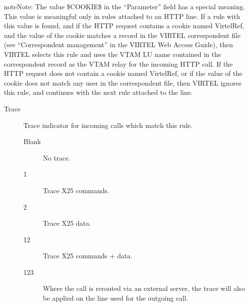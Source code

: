 \documentclass[letterpaper,10pt,english]{sphinxmanual}
\begin{document}
\begin{sphinxadmonition}{note}{Note:}
The value \$COOKIE\$ in the “Parameter” field has a special meaning. This value is meaningful only in rules attached to an HTTP line. If a rule with this value is found, and if the HTTP request contains a cookie named VirtelRef, and the value of the cookie matches a record in the VIRTEL correspondent file (see “Correspondent management” in the VIRTEL Web Access Guide), then VIRTEL selects this rule and uses the VTAM LU name contained in the correspondent record as the VTAM relay for the incoming HTTP call. If the HTTP request does not contain a cookie named VirtelRef, or if the value of the cookie does not match any user in the correspondent file, then VIRTEL ignores this rule, and continues with the next rule attached to the line.
\end{sphinxadmonition}
\begin{description}
\item[{Trace}] \leavevmode
Trace indicator for incoming calls which match this rule.
\begin{description}
\item[{Blank}] \leavevmode
No trace.

\item[{1}] \leavevmode
Trace X25 commands.

\item[{2}] \leavevmode
Trace X25 data.

\item[{12}] \leavevmode
Trace X25 commands + data.

\item[{123}] \leavevmode
Where the call is rerouted via an external server, the trace will also be applied on the line used for the outgoing call.

\end{description}

\end{description}
\end{document}
